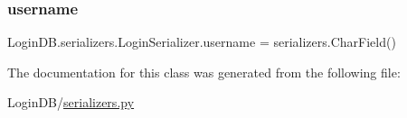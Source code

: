 \mbox{\label{class_login_d_b_1_1serializers_1_1_login_serializer_a67460bfa682abfd395be3a19f2ee56af}} 
\subsubsection{\texorpdfstring{username}{username}}
{\footnotesize\ttfamily Login\+D\+B.\+serializers.\+Login\+Serializer.\+username = serializers.\+Char\+Field()\hspace{0.3cm}{\ttfamily [static]}}



The documentation for this class was generated from the following file\+:\begin{DoxyCompactItemize}
\item 
Login\+D\+B/\hyperlink{serializers_8py}{serializers.\+py}\end{DoxyCompactItemize}
